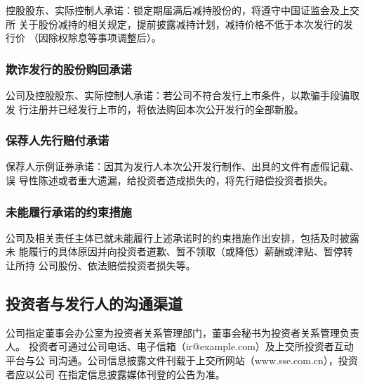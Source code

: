 控股股东、实际控制人承诺：锁定期届满后减持股份的，将遵守中国证监会及上交所
关于股份减持的相关规定，提前披露减持计划，减持价格不低于本次发行的发行价
（因除权除息等事项调整后）。

\subsubsection{欺诈发行的股份购回承诺}

公司及控股股东、实际控制人承诺：若公司不符合发行上市条件，以欺骗手段骗取发
行注册并已经发行上市的，将依法购回本次公开发行的全部新股。

\subsubsection{保荐人先行赔付承诺}

保荐人示例证券承诺：因其为发行人本次公开发行制作、出具的文件有虚假记载、误
导性陈述或者重大遗漏，给投资者造成损失的，将先行赔偿投资者损失。

\subsubsection{未能履行承诺的约束措施}

公司及相关责任主体已就未能履行上述承诺时的约束措施作出安排，包括及时披露未
能履行的具体原因并向投资者道歉、暂不领取（或降低）薪酬或津贴、暂停转让所持
公司股份、依法赔偿投资者损失等。

\subsection{投资者与发行人的沟通渠道}

公司指定董事会办公室为投资者关系管理部门，董事会秘书为投资者关系管理负责人。
投资者可通过公司电话、电子信箱（ir@example.com）及上交所投资者互动平台与公
司沟通。公司信息披露文件刊载于上交所网站（www.sse.com.cn），投资者应以公司
在指定信息披露媒体刊登的公告为准。
